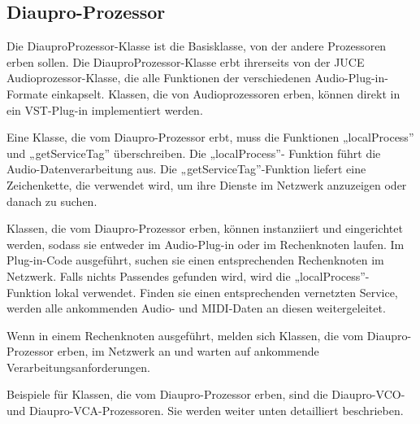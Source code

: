 \subsection{Diaupro-Prozessor}

Die DiauproProzessor-Klasse ist die Basisklasse, von der andere Prozessoren erben sollen. Die DiauproProzessor-Klasse erbt ihrerseits  von der JUCE Audioprozessor-Klasse, die alle Funktionen der verschiedenen Audio-Plug-in-Formate einkapselt. Klassen, die von Audioprozessoren erben, können direkt in ein VST-Plug-in implementiert werden.

Eine Klasse, die vom Diaupro-Prozessor erbt, muss die Funktionen „localProcess” und „getServiceTag” überschreiben. Die „localProcess”- Funktion führt die Audio-Datenverarbeitung aus. Die „getServiceTag”-Funktion liefert eine Zeichenkette, die verwendet wird, um ihre Dienste im Netzwerk anzuzeigen oder danach zu suchen.

Klassen, die vom Diaupro-Prozessor erben, können instanziiert und eingerichtet werden, sodass sie entweder im Audio-Plug-in oder im Rechenknoten laufen. Im Plug-in-Code ausgeführt, suchen sie einen entsprechenden Rechenknoten im Netzwerk. Falls nichts Passendes gefunden wird, wird die „localProcess”- Funktion lokal verwendet. Finden sie einen entsprechenden vernetzten Service, werden alle ankommenden Audio- und MIDI-Daten an diesen weitergeleitet.

Wenn in einem Rechenknoten ausgeführt, melden sich Klassen, die vom Diaupro-Prozessor erben, im Netzwerk an und warten auf ankommende Verarbeitungsanforderungen.

Beispiele für Klassen, die vom Diaupro-Prozessor erben, sind die Diaupro-VCO- und  Diaupro-VCA-Prozessoren. Sie werden weiter unten detailliert beschrieben.
